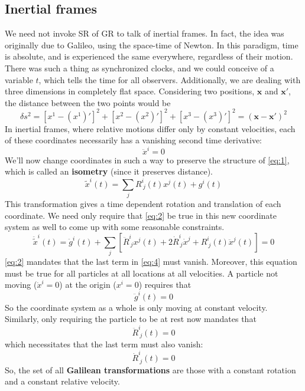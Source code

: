 \documentclass[10pt]{article}
\begin{document}
	\subsection{Inertial frames} %
	\label{sub:inertial_frames}
	We need not invoke SR of GR to talk of inertial frames. In fact, the idea was originally due to Galileo, using the space-time of Newton. In this paradigm, time is absolute, and is experienced the same everywhere, regardless of their motion. There was such a thing as synchronized clocks, and we could conceive of a variable $t$, which tells the time for all observers. Additionally, we are dealing with three dimensions in completely flat space. Considering two positions, $\mathbf{x}$ and $\mathbf{x}'$, the distance between the two points would be
	\begin{equation}
		\label{eq:1} \delta s^2=\left[x^1-(x^1)'\right]^2 + \left[x^2-(x^2)'\right]^2 + \left[x^3-(x^3)'\right]^2 = (\mathbf{x}-\mathbf{x}')^2
	\end{equation}
	In inertial frames, where relative motions differ only by constant velocities, each of these coordinates necessarily has a vanishing second time derivative:
	\begin{equation}
		\label{eq:2} \ddot{x}^i=0
	\end{equation}
	We'll now change coordinates in such a way to preserve the structure of \eqref{eq:1}, which is called an \textbf{isometry} (since it preserves distance). 
	\begin{equation}
		\label{eq:3} \tilde{x}^i(t) = \sum_j R^i_{\ j}(t)x^j(t) + g^i(t)
	\end{equation}
	This transformation gives a time dependent rotation and translation of each coordinate. We need only require that \eqref{eq:2} be true in this new coordinate system as well to come up with some reasonable constraints.
	\begin{equation}
		\label{eq:4} \ddot{\tilde{x}}^i(t) = \ddot{g}^i(t)+\sum_j\left[\ddot{R}^i_{\ j}x^j(t) + 2\dot{R}^i_{\ j}\dot{x}^j+R^i_{\ j}(t)\ddot{x}^j(t)\right]=0
	\end{equation}
	\eqref{eq:2} mandates that the last term in \eqref{eq:4} must vanish. Moreover, this equation must be true for all particles at all locations at all velocities. A particle not moving ($\dot{x}^i=0$) at the origin ($x^i=0$) requires that
	\begin{equation}
		\label{eq:5} \ddot{g}^i(t)=0
	\end{equation}
	So the coordinate system as a whole is only moving at constant velocity. Similarly, only requiring the particle to be at rest now mandates that
	\begin{equation}
		\label{eq:6} \ddot{R}^i_{\ j}(t)=0
	\end{equation}
	which necessitates that the last term must also vanish:
	\begin{equation}
		\label{eq:7} \dot{R}^i_{\ j}(t)=0
	\end{equation}
	So, the set of all \textbf{Galilean transformations} are those with a constant rotation and a constant relative velocity.

	
	
	
	
	
	
	
	
	
\end{document}
